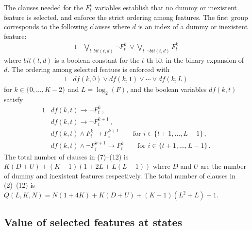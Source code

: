 \documentclass[10pt]{article}
\begin{document}
\medskip\noindent
The clauses needed for the $F^k_t$ variables establish that no dummy
or inexistent feature is selected, and enforce the strict ordering
among features. The first group corresponds to the following clauses
where $d$ is an index of a dummy or inexistent feature:
\begin{alignat}{1}
  &\bigvee_{t:bit(t,d)} \neg F^k_t \ \lor \bigvee_{t:\neg bit(t,d)} F^k_t
\end{alignat}
where $bit(t,d)$ is a boolean constant for the $t$-th bit in the binary
expansion of $d$.  The ordering among selected featues is enforced with
\begin{alignat}{1}
  &df(k,0) \lor df(k,1) \lor \cdots \lor df(k,L)
\end{alignat}
for $k\in\{0,\ldots,K-2\}$ and $L=\log_2(F)$, and the boolean
variables $df(k,t)$ satisfy
\begin{alignat}{1}
  &df(k,t) \rightarrow \neg F^k_t \,, \\
  &df(k,t) \rightarrow \neg F^{k+1}_t \,, \\
  &df(k,t) \land F^k_i \rightarrow F^{k+1}_i \qquad \text{for $i\in\{t+1,\ldots,L-1\}$} \,, \\
  &df(k,t) \land \neg F^{k+1}_i \rightarrow F^k_i \qquad \text{for $i\in\{t+1,\ldots,L-1\}$} \,.
\end{alignat}
The total number of clauses in (7)--(12) is $K(D+U) + (K-1)(1 + 2L + L(L-1))$
where $D$ and $U$ are the number of dummy and inexistent features respectively.
The total number of clauses in (2)--(12) is
$Q(L,K,N)=N(1+4K) + K(D+U) + (K-1)(L^2 + L) - 1$.


\subsection{Value of selected features at states}
\end{document}
